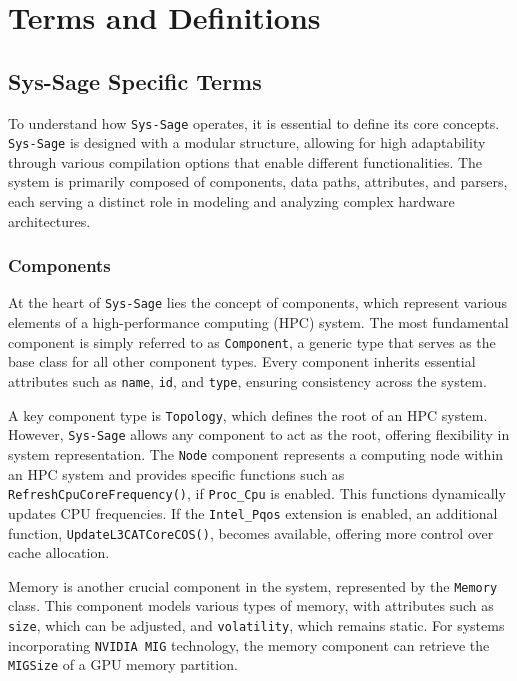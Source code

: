 \chapter{Terms and Definitions}\label{chapter:terms_and_definition}

\section{Sys-Sage Specific Terms}

To understand how \texttt{Sys-Sage} operates, it is essential to define its core concepts. \texttt{Sys-Sage} is designed with a modular structure, allowing for high adaptability through various compilation options that enable different functionalities. The system is primarily composed of components, data paths, attributes, and parsers, each serving a distinct role in modeling and analyzing complex hardware architectures.

\subsection{Components}

At the heart of \texttt{Sys-Sage} lies the concept of components, which represent various elements of a high-performance computing (\ac{HPC}) system. The most fundamental component is simply referred to as \texttt{Component}, a generic type that serves as the base class for all other component types. Every component inherits essential attributes such as \texttt{name}, \texttt{id}, and \texttt{type}, ensuring consistency across the system.

A key component type is \texttt{Topology}, which defines the root of an \ac{HPC} system. However, \texttt{Sys-Sage} allows any component to act as the root, offering flexibility in system representation. The \texttt{Node} component represents a computing node within an \ac{HPC} system and provides specific functions such as \texttt{RefreshCpuCoreFrequency()}, if \texttt{Proc\_Cpu} is enabled. This functions dynamically updates CPU frequencies. If the \texttt{Intel\_Pqos} extension is enabled, an additional function, \texttt{UpdateL3CATCoreCOS()}, becomes available, offering more control over cache allocation.

Memory is another crucial component in the system, represented by the \texttt{Memory} class. This component models various types of memory, with attributes such as \texttt{size}, which can be adjusted, and \texttt{volatility}, which remains static. For systems incorporating \texttt{NVIDIA MIG} technology, the memory component can retrieve the \texttt{MIGSize} of a \ac{GPU} memory partition.

